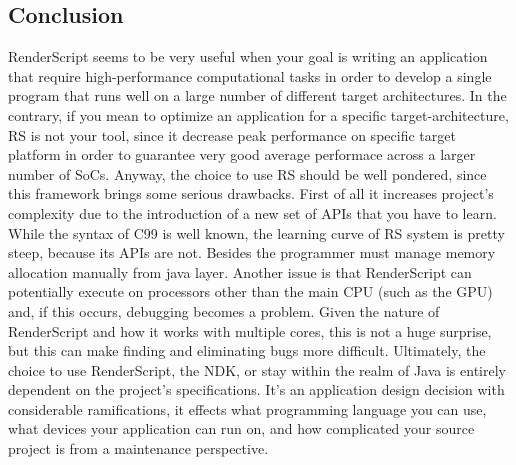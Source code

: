 \documentclass[a4paper,10pt]{article}
\begin{document}
\begin{multicols}{2}
\section{Conclusion}
RenderScript seems to be very useful when your goal is writing an application that require high-performance computational tasks in order to develop a single program that runs well on a large number of different target architectures.
In the contrary, if you mean to optimize an application for a specific target-architecture, RS is not your tool, since it decrease peak performance on specific target platform in order to guarantee very good average performace across a larger number of SoCs.
Anyway, the choice to use RS should be well pondered, since this framework brings some serious drawbacks.
First of all it increases project's complexity due to the introduction of a new set of APIs that you have to learn. While the syntax of C99 is well known, the learning curve of RS system is pretty steep, because its APIs are not. Besides the programmer must manage memory allocation manually from java layer. 
Another issue is that RenderScript can potentially execute on processors other than the main CPU (such as the GPU) and, if this occurs, debugging becomes a problem. Given the nature of RenderScript and how it works with multiple cores, this is not a huge surprise, but this can make finding and eliminating bugs more difficult.
Ultimately, the choice to use RenderScript, the NDK, or stay within the realm of Java is entirely dependent on the project's specifications. It's an application design decision with considerable ramifications, it effects what programming language you can use, what devices your application can run on, and how complicated your source project is from a maintenance perspective.

\nocite{*}



\end{multicols}

\pagestyle{empty}                  %

\begin{appendices}




\end{appendices}
\end{document}
